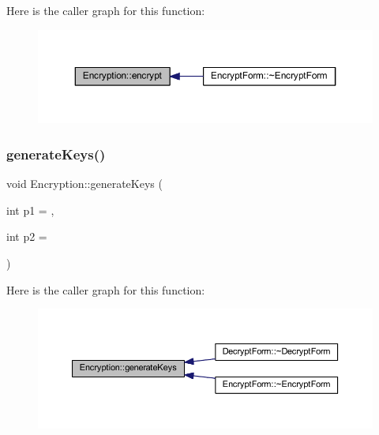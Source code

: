 Here is the caller graph for this function\+:
\nopagebreak
\begin{figure}[H]
\begin{center}
\leavevmode
\includegraphics[width=350pt]{class_encryption_a764237662a4daa19502e6454126fa279_icgraph}
\end{center}
\end{figure}
\hypertarget{class_encryption_a737b60a95e826d7a99a3a3f62c9889d2}{}\label{class_encryption_a737b60a95e826d7a99a3a3f62c9889d2} 
\subsubsection{\texorpdfstring{generate\+Keys()}{generateKeys()}}
{\footnotesize\ttfamily void Encryption\+::generate\+Keys (\begin{DoxyParamCaption}\item[{int}]{p1 = {},  }\item[{int}]{p2 = {} }\end{DoxyParamCaption})}

Here is the caller graph for this function\+:
\nopagebreak
\begin{figure}[H]
\begin{center}
\leavevmode
\includegraphics[width=350pt]{class_encryption_a737b60a95e826d7a99a3a3f62c9889d2_icgraph}
\end{center}
\end{figure}
\hypertarget{class_encryption_a4e2cab5c9d5349f085d40c8373b1985b}{}\label{class_encryption_a4e2cab5c9d5349f085d40c8373b1985b} 
